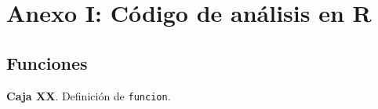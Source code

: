 \section*{Anexo I: Código de análisis en R}\label{anexo1}

\subsection*{Funciones}

\textbf{Caja XX}. Definición de \texttt{funcion}.

